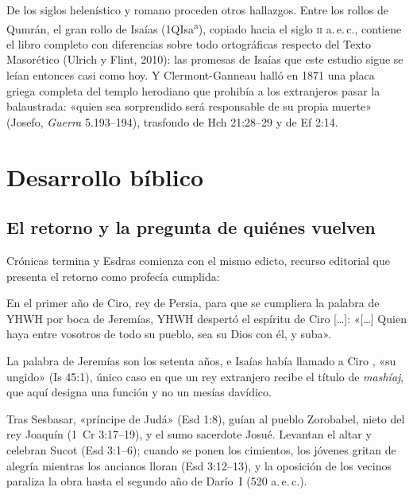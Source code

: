De los siglos helenístico y romano proceden otros hallazgos. Entre los rollos de Qumrán, el gran rollo de Isaías (1QIsa\textsuperscript{a}), copiado hacia el siglo \textsc{ii} a.\,e.\,c., contiene el libro completo con diferencias sobre todo ortográficas respecto del Texto Masorético (Ulrich y Flint, 2010): las promesas de Isaías que este estudio sigue se leían entonces casi como hoy. Y Clermont-Ganneau halló en 1871 una placa griega completa del templo herodiano que prohibía a los extranjeros pasar la balaustrada: «quien sea sorprendido será responsable de su propia muerte» (Josefo, \emph{Guerra} 5.193--194), trasfondo de Hch 21:28--29 y de Ef 2:14.

\section{Desarrollo bíblico}

\subsection{El retorno y la pregunta de quiénes vuelven}
Crónicas termina y Esdras comienza con el mismo edicto, recurso editorial que presenta el retorno como profecía cumplida:
\begin{cita}En el primer año de Ciro, rey de Persia, para que se cumpliera la palabra de YHWH por boca de Jeremías, YHWH despertó el espíritu de Ciro [\ldots]: «[\ldots] Quien haya entre vosotros de todo su pueblo, sea su Dios con él, y suba».\end{cita}
La palabra de Jeremías son los setenta años, e Isaías había llamado a Ciro , «su ungido» (Is 45:1), único caso en que un rey extranjero recibe el título de \emph{mashíaj}, que aquí designa una función y no un mesías davídico.

Tras Sesbasar, «príncipe de Judá» (Esd 1:8), guían al pueblo Zorobabel, nieto del rey Joaquín (1~Cr 3:17--19), y el sumo sacerdote Josué. Levantan el altar y celebran Sucot (Esd 3:1--6); cuando se ponen los cimientos, los jóvenes gritan de alegría mientras los ancianos lloran (Esd 3:12--13), y la oposición de los vecinos paraliza la obra hasta el segundo año de Darío~I (520 a.\,e.\,c.).


